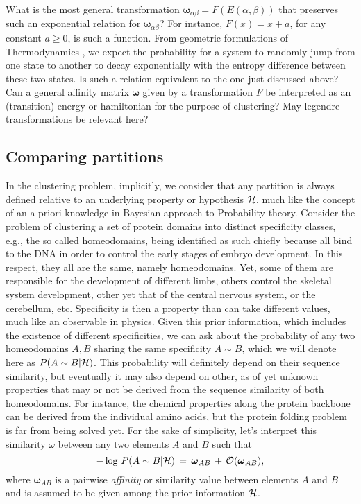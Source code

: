 \documentclass[twocolumn,aps,sort,nofootinbib]{revtex4}
\begin{document}
What is the most general transformation 
$\boldsymbol{\omega}_{\alpha\beta}=F(E(\alpha,\beta))$
that preserves such an exponential relation for $\boldsymbol{\omega}_{\alpha\beta}$?
For instance, $F(x)=x+a$, for any constant $a\ge 0$, is such a function.
From geometric formulations of Thermodynamics \cite{Ruppeiner79,Ruppeiner95},
we expect the probability for a system to randomly jump 
from one state to another to decay exponentially 
with the entropy difference between these two states.
Is such a relation equivalent to the one just discussed above?
Can a general affinity matrix $\boldsymbol{\omega}$ given by a transformation $F$
be interpreted as an (transition) energy or hamiltonian for the purpose of clustering? 
May legendre transformations be relevant here? 
\subsection{Comparing partitions}\label{ComparingPartitions}
In the clustering problem, implicitly, we consider 
that any partition is always defined relative to an underlying 
property or hypothesis ${\cal H}$, much like the concept of an a priori 
knowledge in Bayesian approach to Probability theory.  Consider the 
problem of clustering a set of protein domains into distinct specificity 
classes, e.g., the so %
called homeodomains, being identified 
as such chiefly because all bind to the DNA in order to control the early 
stages of embryo development. In this respect, they all are the same, 
namely homeodomains. Yet, some of them are responsible for the development 
of different limbs, others control the skeletal system development, 
other yet that of the central nervous system, or the cerebellum, etc. 
Specificity is then a property than can take different values, much like 
an observable in physics. Given this prior information, which includes the existence 
of different specificities, we can ask about the probability of any two 
homeodomains \(A, B\) sharing the same specificity \(A\sim B\), which we 
will denote here as \(P(A\sim B|{\cal H})\). 
This probability will definitely depend on their sequence similarity, but
eventually it may also depend on other, as of yet unknown properties that
may or not be derived from the sequence similarity of both homeodomains.
For instance, the chemical properties along the protein backbone can
be derived from the individual amino acids, but 
the protein folding problem is far from being solved yet.
For the sake of simplicity, 
let's interpret this similarity $\omega$ between any 
two elements \(A\) and \(B\) such that
\begin{equation}
-\log\,P(A\sim B|{\cal H}) \,=\, {\boldsymbol \omega}_{AB}\,+\,\mathcal{O}({\boldsymbol \omega}_{AB}),
\end{equation}
where ${\boldsymbol\omega}_{AB}$ is a pairwise {\sl affinity} or 
similarity value between elements \(A\) and \(B\) 
and is assumed to be given among the prior information ${\cal H}$.
\end{document}
